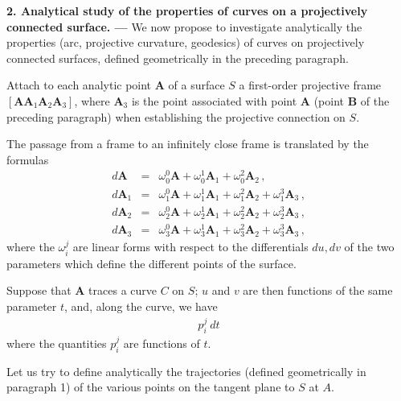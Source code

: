 

{\bf 2. Analytical study of the properties of curves on a projectively connected surface. --- }
% 
We now propose to investigate analytically the properties (arc, projective curvature, geodesics) of curves on projectively connected surfaces, defined geometrically in the preceding paragraph.

Attach to each analytic point $\bm A$ of a surface $S$ a first-order projective frame $[\bm{AA}_1 \bm A_2 \bm A_3]$, where $\bm A_3$ is the point associated with point $\bm A$ (point $\bm B$ of the preceding paragraph) when establishing the projective connection on $S$.

The passage from a frame to an infinitely close frame is translated by the formulas  
\begin{eqnarray*}
d\bm A &=& \omega^0_0 \bm A + \omega^1_0 \bm A_1 + \omega^2_0 \bm A_2\, , 
\\
d\bm A_1 &=& \omega^0_1 \bm A + \omega^1_1 \bm A_1 + \omega^2_1 \bm A_2 + \omega^3_1 \bm A_3\, , 
\\
d\bm A_2 &=& \omega^0_2 \bm A + \omega^1_2 \bm A_1 + \omega^2_2 \bm A_2 + \omega^3_2 \bm A_3\, , 
\\
d\bm A_3 &=& \omega^0_3 \bm A + \omega^1_3 \bm A_1 + \omega^2_3 \bm A_2 + \omega^3_3 \bm A_3\, ,
\end{eqnarray*}
where the $\omega^j_i$ are linear forms with respect to the differentials $du, dv$ of the two parameters which define the different points of the surface.

Suppose that $\bm A$ traces a curve $C$ on $S$; $u$ and $v$ are then functions of the same parameter $t$, and, along the curve, we have
\begin{eqnarray*}
p^j_i \ dt
\end{eqnarray*}
where the quantities $p^j_i$ are functions of $t$.

Let us try to define analytically the trajectories (defined geometrically in paragraph 1) of the various points on the tangent plane to $S$ at $A$.

